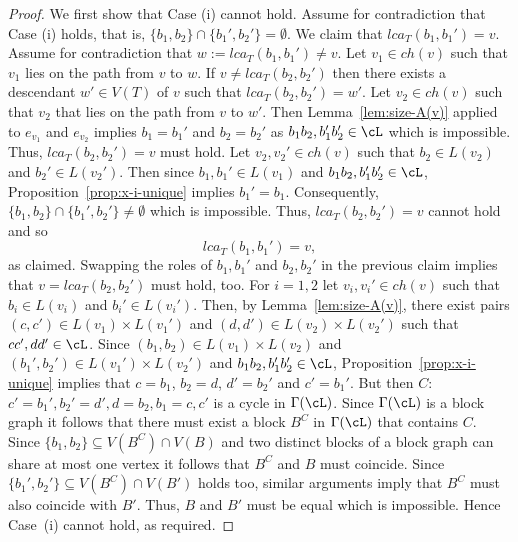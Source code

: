 \begin{proof}
  We first show that Case (i) cannot hold. Assume for contradiction that Case
  (i) holds, that is, $\{b_1,b_2\}\cap\{b_1',b_2'\}=\emptyset $.  We claim
  that $lca_T(b_1,b_1')=v$. Assume for contradiction that
  $w:=lca_T(b_1,b_1')\not=v$. Let $v_1\in ch(v)$ such that $v_1$ lies on the
  path from $v$ to $w$. If $v\not =lca_T(b_2,b_2')$ then there exists a
  descendant $w'\in V(T)$ of $v$ such that $lca_T(b_2,b_2')=w'$. Let $v_2\in
  ch(v)$ such that $v_2$ that lies on the path from $v$ to $w'$. Then
  Lemma~\ref{lem:size-A(v)} applied to $e_{v_1}$ and $e_{v_2}$
implies $b_1=b_1'$ and $b_2=b_2'$ as $b_1b_2,b_1'b_2'\in \cL$
which is impossible. Thus, $lca_T(b_2,b_2')=v$
must hold. Let $v_2,v_2'\in ch(v)$ such that $b_2\in L(v_2)$
and $b_2'\in L(v_2')$. 
Then since $b_1,b_1'\in L(v_1)$ and $b_1b_2, b_1'b_2'\in \cL$,
Proposition~\ref{prop:x-i-unique} implies $b_1'=b_1$.
Consequently, $\{b_1,b_2\}\cap\{b_1',b_2'\}\not=\emptyset $ which is
impossible.
%
Thus, $lca_T(b_2,b_2')=v$ cannot hold and so
$$
lca_T(b_1,b_1')=v,
$$ 
as claimed.  Swapping the roles of $b_1,b_1'$ and $b_2,b_2'$ in the previous
claim implies that $v= lca_T(b_2,b_2')$ must hold, too.  For $i=1,2$ let
$v_i,v_i'\in ch(v)$ such that $b_i\in L(v_i)$ and $b_i'\in L(v_i')$.  Then, by
Lemma~\ref{lem:size-A(v)}, there exist pairs $(c,c')\in L(v_1)\times L(v_1')$
and $(d,d')\in L(v_2)\times L(v_2')$ such that $cc',dd'\in\cL$.  Since
$(b_1,b_2)\in L(v_1)\times L(v_2)$ and $(b_1',b_2')\in L(v_1')\times L(v_2')$
and $b_1b_2,b_1'b_2'\in\cL$, Proposition~\ref{prop:x-i-unique} implies that
$c=b_1$, $b_2=d$, $d'=b_2'$ and $c'=b_1'$. But then $C$: $c'=b_1',b_2'=d',
d=b_2, b_1=c,c'$ is a cycle in $\Gamma(\cL)$.  Since $\Gamma(\cL)$ is a block
graph it follows that there must exist a block $B^C$ in $\Gamma(\cL)$ that
contains $C$.  Since $\{b_1,b_2\}\subseteq V(B^C)\cap V(B)$ and two distinct
blocks of a block graph can share at most one vertex it follows that $B^C$ and
$B$ must coincide. Since $\{b_1',b_2'\}\subseteq V(B^C)\cap V(B')$ holds too,
similar arguments imply that $B^C$ must also coincide with $B'$.  Thus, $B$
and $B'$ must be equal which is impossible.  Hence Case~(i) cannot hold, as
required.


\end{proof}
